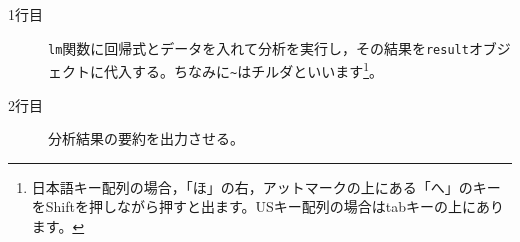 \begin{description}
	\item[1行目] \texttt{lm}関数に回帰式とデータを入れて分析を実行し，その結果を\texttt{result}オブジェクトに代入する。ちなみに\verb|~|はチルダといいます\footnote{日本語キー配列の場合，「ほ」の右，アットマークの上にある「へ」のキーをShiftを押しながら押すと出ます。USキー配列の場合はtabキーの上にあります。}。
	\item[2行目] 分析結果の要約を出力させる。
\end{description}
